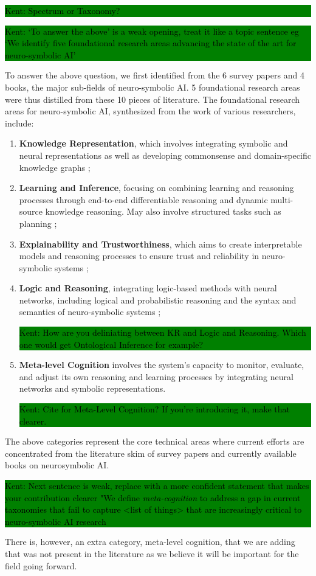 \documentclass[hf]{ceurart}
\newcommand{\pinaforecomment}[4]{\colorbox{#1}{\textcolor{#4}{\parbox{.8\linewidth}{#2: #3}}}}
\newcommand{\osullikomment}[1]{\pinaforecomment{green}{Kent}{#1}{black}}
\begin{document}
\osullikomment{Spectrum or Taxonomy?}

\osullikomment{`To answer the above' is a weak opening, treat it like a topic sentence eg `We identify five foundational research areas advancing the state of the art for neuro-symbolic AI'}
To answer the above question, we first identified from the 6 survey papers and 4 books, the major sub-fields of neuro-symbolic AI. 5 foundational research areas were thus distilled from these 10 pieces of literature. The foundational research areas for neuro-symbolic AI, synthesized from the work of various researchers, include: 
\begin{enumerate}
    \item \textbf{Knowledge Representation}, which involves integrating symbolic and neural representations as well as developing commonsense and domain-specific knowledge graphs \cite{Gibaut2023, Hitzler2023, Shakarian2023};
    \item \textbf{Learning and Inference}, focusing on combining learning and reasoning processes through end-to-end differentiable reasoning and dynamic multi-source knowledge reasoning. May also involve structured tasks such as planning \cite{Yu2021, Wan2024, Dingli2023};
    \item \textbf{Explainability and Trustworthiness}, which aims to create interpretable models and reasoning processes to ensure trust and reliability in neuro-symbolic systems \cite{Marra2024, MichelDeletie2024};
    \item \textbf{Logic and Reasoning}, integrating logic-based methods with neural networks, including logical and probabilistic reasoning and the syntax and semantics of neuro-symbolic systems \cite{Marra2024, Shakarian2023};
    \osullikomment{How are you deliniating between KR and Logic and Reasoning. Which one would get Ontological Inference for example? }
    \item \textbf{Meta-level Cognition} involves the system's capacity to monitor, evaluate, and adjust its own reasoning and learning processes by integrating neural networks and symbolic representations.
    \osullikomment{Cite for Meta-Level Cognition? If you're introducing it, make that clearer.}

\end{enumerate}

The above categories represent the core technical areas where current efforts are concentrated from the literature skim of survey papers and currently available books on neurosymbolic AI. 
\osullikomment{Next sentence is weak, replace with a more confident statement that makes your contribution clearer "We define \textit{meta-cognition} to address a gap in current taxonomies that fail to capture <list of things> that are increasingly critical to neuro-symbolic AI research}
There is, however, an extra category, meta-level cognition, that we are adding that was not present in the literature as we believe it will be important for the field going forward. 
\end{document}
